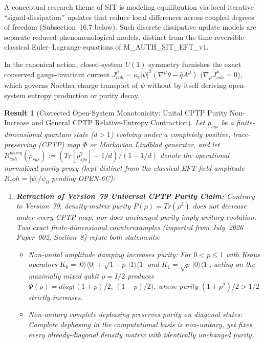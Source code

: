 \documentclass[american,11pt,letterpaper]{article}
\newtheorem{result}{Result}
\newcommand{\Rcoh}{R_{\mathrm{coh}}}
\def\mathrm#1{#1}%
\def\texttt#1{#1}%
\def\emph#1{#1}%
\def\Rcoh{R_coh}%
\begin{document}
A conceptual research theme of SIT is modeling equilibration via local iterative ``signal-dissipation'' updates that reduce local differences across coupled degrees of freedom (Subsection~16.7 below). Such discrete dissipative update models are \emph{separate reduced phenomenological models}, distinct from the time-reversible classical Euler--Lagrange equations of \texttt{M\_AUTH\_SIT\_EFT\_v1}.

In the canonical action, closed-system $U(1)$ symmetry furnishes the exact conserved gauge-invariant current $J^\mu_{\mathrm{coh}} = \kappa_c |\psi|^2 (\nabla^\mu\theta - \hat{q}A^\mu)$ ($\nabla_\mu J^\mu_{\mathrm{coh}} = 0$), which governs Noether charge transport of $\psi$ without by itself deriving open-system entropy production or purity decay.

\begin{result}[Corrected Open-System Monotonicity: Unital CPTP Purity Non-Increase and General CPTP Relative-Entropy Contraction]
\label{thm:CoherenceMonotonicity}
Let $\rho_{\mathrm{sys}}$ be a finite-dimensional quantum state ($d > 1$) evolving under a completely positive, trace-preserving (CPTP) map $\Phi$ or Markovian Lindblad generator, and let $R_{\mathrm{coh}}^{\mathrm{proxy}}(\rho_{\mathrm{sys}}) := (\mathrm{Tr}[\rho_{\mathrm{sys}}^2] - 1/d)/(1 - 1/d)$ denote the operational normalized purity proxy (kept distinct from the classical EFT field amplitude $\Rcoh = |\psi|/\psi_0$ pending \texttt{OPEN-6C}):
\begin{enumerate}[leftmargin=2em]
  \item \textbf{Retraction of Version~79 Universal CPTP Purity Claim:} Contrary to Version~79, density-matrix purity $P(\rho) = \mathrm{Tr}(\rho^2)$ does \emph{not} decrease under every CPTP map, nor does unchanged purity imply unitary evolution. Two exact finite-dimensional counterexamples (imported from July~2026 Paper~002, Section~8) refute both statements:
  \begin{itemize}
    \item \emph{Non-unital amplitude damping increases purity:} For $0 < p \le 1$ with Kraus operators $K_0 = |0\rangle\langle 0| + \sqrt{1-p}\,|1\rangle\langle 1|$ and $K_1 = \sqrt{p}\,|0\rangle\langle 1|$, acting on the maximally mixed qubit $\rho = I/2$ produces $\Phi(\rho) = \mathrm{diag}\bigl((1+p)/2,\,(1-p)/2\bigr)$, whose purity $(1+p^2)/2 > 1/2$ strictly increases.
    \item \emph{Non-unitary complete dephasing preserves purity on diagonal states:} Complete dephasing in the computational basis is non-unitary, yet fixes every already-diagonal density matrix with identically unchanged purity.

\end{itemize}
\end{enumerate}
\end{result}
\end{document}
